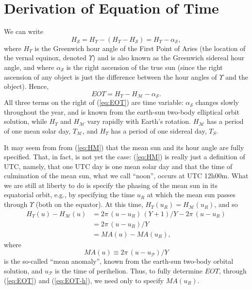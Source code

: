 \documentclass[]{AGUJournal}
\newcommand{\beq}{\begin{equation}}
\newcommand{\eeq}{\end{equation}}
\newcommand{\sun}{{\mathcal{S}}}
\newcommand{\mqsun}{{\mathcal{M}}}
\newcommand{\peri}{{\mathcal{P}}}
\newcommand{\fpoa}{\Upsilon}
\newcommand{\Tmsol}{T_\mqsun}
\newcommand{\al}{\alpha}
\newcommand{\MA}{M\!A}
\begin{document}
\section{Derivation of Equation of Time}

We can write
\beq
H_\sun  = H_\fpoa - (H_\fpoa - H_\sun) = H_\fpoa - \al_\sun,
\eeq
where $H_\fpoa$ is the Greenwich hour angle of the First Point of Aries (the location of the vernal equinox, denoted $\fpoa$) and is also 
known as the Greenwich sidereal hour angle, and where $\al_\sun$ is the right ascension of the true sun (since the right ascension of 
any object is just the difference between the hour angles of $\fpoa$ and the object). Hence,
\beq
EOT = H_\fpoa - H_\mqsun - \al_\sun.
\label{eq:EOT}
\eeq
All three terms on the right of (\ref{eq:EOT}) are time variable: $\al_\sun$ changes slowly throughout the year, and is known from the earth-sun 
two-body elliptical orbit solution, while $H_\fpoa$ and $H_\mqsun$ vary rapidly with Earth's rotation. $H_\mqsun$ has a period of one mean solar 
day, $\Tmsol$, and $H_\fpoa$ has a period of one sidereal day, $T_S$.

It may seem from from (\ref{eq:HM}) that the mean sun and its hour angle are fully specified. That, in fact, is not yet the case: (\ref{eq:HM}) is really 
just a definition of UTC, namely, that one UTC day is one mean solar day and that the time of culmination of the mean sun, what we call ``noon'', 
occurs at UTC 12h00m. What we are still at liberty to do is specify the phasing of the mean sun in its equatorial orbit, e.g., by specifying the time 
$u_R$ at which the mean sun passes through $\fpoa$ (both on the equator). At this time, $H_\fpoa(u_R) = H_\mqsun(u_R)$, and so
\beq
\begin{split}
H_\fpoa(u) - H_\mqsun(u) 
& = 2\pi\, (u - u_R)\,(Y+1)/Y - 2\pi\, (u - u_R) \\
& = 2\pi\, (u - u_R) / Y\\
& = \MA(u) - \MA(u_R),
\end{split}
\label{eq:EOT-h}
\eeq
where 
\beq
\MA(u) \equiv 2\pi\, (u - u_\peri) / Y
\label{eq:MA}
\eeq
is the so-called ``mean anomaly'', known from the earth-sun two-body orbital solution, and $u_\peri$ is the time of perihelion. 
Thus, to fully determine $EOT$, through (\ref{eq:EOT}) and (\ref{eq:EOT-h}), we need only to specify $\MA(u_R)$.
\end{document}

